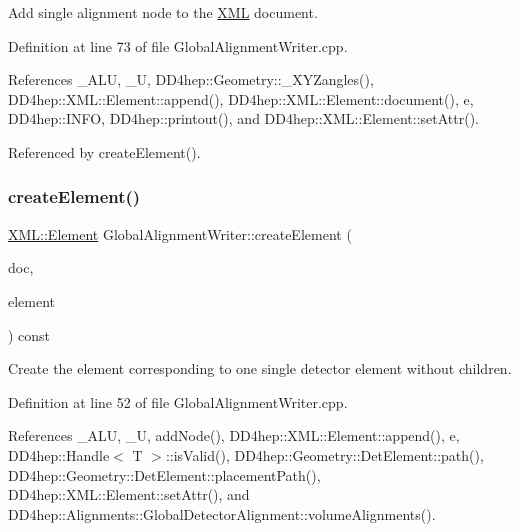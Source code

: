 Add single alignment node to the \hyperlink{namespace_d_d4hep_1_1_x_m_l}{X\+ML} document. 



Definition at line 73 of file Global\+Alignment\+Writer.\+cpp.



References \+\_\+\+A\+LU, \+\_\+U, D\+D4hep\+::\+Geometry\+::\+\_\+\+X\+Y\+Zangles(), D\+D4hep\+::\+X\+M\+L\+::\+Element\+::append(), D\+D4hep\+::\+X\+M\+L\+::\+Element\+::document(), e, D\+D4hep\+::\+I\+N\+FO, D\+D4hep\+::printout(), and D\+D4hep\+::\+X\+M\+L\+::\+Element\+::set\+Attr().



Referenced by create\+Element().

\hypertarget{class_d_d4hep_1_1_alignments_1_1_global_alignment_writer_a1c6a08c54de9ea8fb16b1e534209513f}{}\label{class_d_d4hep_1_1_alignments_1_1_global_alignment_writer_a1c6a08c54de9ea8fb16b1e534209513f} 
\subsubsection{\texorpdfstring{create\+Element()}{createElement()}}
{\footnotesize\ttfamily \hyperlink{class_d_d4hep_1_1_x_m_l_1_1_element}{X\+M\+L\+::\+Element} Global\+Alignment\+Writer\+::create\+Element (\begin{DoxyParamCaption}\item[{\hyperlink{class_d_d4hep_1_1_x_m_l_1_1_document}{X\+M\+L\+::\+Document}}]{doc,  }\item[{\hyperlink{class_d_d4hep_1_1_geometry_1_1_det_element}{Det\+Element}}]{element }\end{DoxyParamCaption}) const}



Create the element corresponding to one single detector element without children. 



Definition at line 52 of file Global\+Alignment\+Writer.\+cpp.



References \+\_\+\+A\+LU, \+\_\+U, add\+Node(), D\+D4hep\+::\+X\+M\+L\+::\+Element\+::append(), e, D\+D4hep\+::\+Handle$<$ T $>$\+::is\+Valid(), D\+D4hep\+::\+Geometry\+::\+Det\+Element\+::path(), D\+D4hep\+::\+Geometry\+::\+Det\+Element\+::placement\+Path(), D\+D4hep\+::\+X\+M\+L\+::\+Element\+::set\+Attr(), and D\+D4hep\+::\+Alignments\+::\+Global\+Detector\+Alignment\+::volume\+Alignments().



